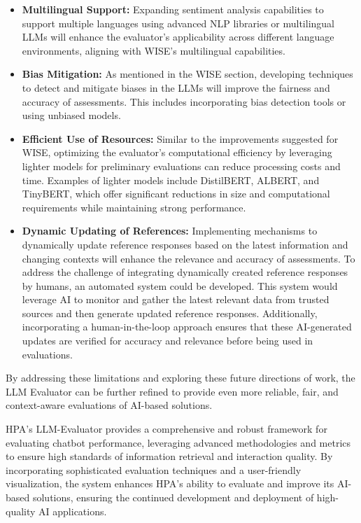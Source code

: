 \begin{itemize}
    \item \textbf{Multilingual Support:} Expanding sentiment analysis capabilities to support multiple languages using advanced NLP libraries or multilingual LLMs will enhance the evaluator's applicability across different language environments, aligning with WISE's multilingual capabilities. \cite{abdullah2021multilingual}
    \item \textbf{Bias Mitigation:} As mentioned in the WISE section, developing techniques to detect and mitigate biases in the LLMs will improve the fairness and accuracy of assessments. This includes incorporating bias detection tools or using unbiased models. \cite{ferrara2023fairness}
    \item \textbf{Efficient Use of Resources:} Similar to the improvements suggested for WISE, optimizing the evaluator's computational efficiency by leveraging lighter models for preliminary evaluations can reduce processing costs and time. Examples of lighter models include DistilBERT, ALBERT, and TinyBERT, which offer significant reductions in size and computational requirements while maintaining strong performance. \cite{sanh2019distilbert} \cite{lan2019albert} \cite{jiao2019tinybert}
    \item \textbf{Dynamic Updating of References:} Implementing mechanisms to dynamically update reference responses based on the latest information and changing contexts will enhance the relevance and accuracy of assessments. To address the challenge of integrating dynamically created reference responses by humans, an automated system could be developed. This system would leverage AI to monitor and gather the latest relevant data from trusted sources and then generate updated reference responses. Additionally, incorporating a human-in-the-loop approach ensures that these AI-generated updates are verified for accuracy and relevance before being used in evaluations. \cite{wu2022survey}
\end{itemize}

By addressing these limitations and exploring these future directions of work, the LLM Evaluator can be further refined to provide even more reliable, fair, and context-aware evaluations of AI-based solutions.

HPA's LLM-Evaluator provides a comprehensive and robust framework for evaluating chatbot performance, leveraging advanced methodologies and metrics to ensure high standards of information retrieval and interaction quality. By incorporating sophisticated evaluation techniques and a user-friendly visualization, the system enhances HPA's ability to evaluate and improve its AI-based solutions, ensuring the continued development and deployment of high-quality AI applications.
